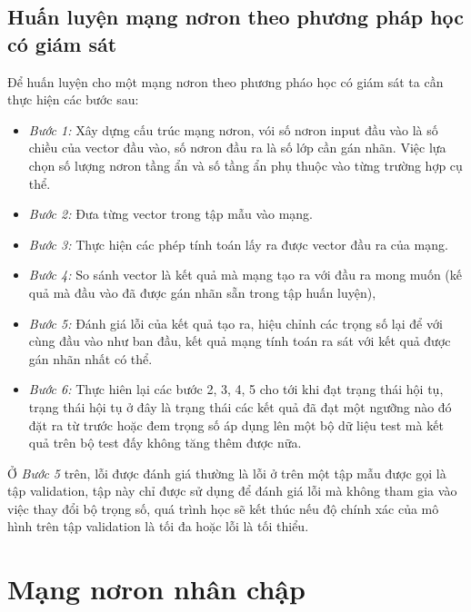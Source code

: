 \documentclass[13pt, a4paper]{extreport}
\begin{document}
\subsection{Huấn luyện mạng nơron theo phương pháp học có giám sát}
\indent Để huấn luyện cho một mạng nơron theo phương pháo học có giám sát ta cần thực hiện các bước sau:
\begin{itemize}
\item \textit{Bước 1: }Xây dựng cấu trúc mạng nơron, vói số nơron input đầu vào là số chiều của vector đầu vào, số nơron đầu ra là số lớp cần gán nhãn. Việc lựa chọn số lượng nơron tầng ẩn và số tầng ẩn phụ thuộc vào từng trường hợp cụ thể.
\item \textit{Bước 2: }Đưa từng vector trong tập mẫu vào mạng.
\item \textit{Bước 3: }Thực hiện các phép tính toán lấy ra được vector đầu ra của mạng.
\item \textit{Bước 4: }So sánh vector là kết quả mà mạng tạo ra với đầu ra mong muốn (kế quả mà đầu vào đã được gán nhãn sẵn trong tập huấn luyện), 
\item \textit{Bước 5: }Đánh giá lỗi của kết quả tạo ra, hiệu chỉnh các trọng số lại để với cùng đầu vào như ban đầu, kết quả mạng tính toán ra sát với kết quả được gán nhãn nhất có thể.
\item \textit{Bước 6: }Thực hiên lại các bước 2, 3, 4, 5 cho tới khi đạt trạng thái hội tụ, trạng thái hội tụ ở đây là trạng thái các kết quả đã đạt một ngưỡng nào đó đặt ra từ trước hoặc đem trọng số áp dụng lên một bộ dữ liệu test mà kết quả trên bộ test đấy không tăng thêm được nữa.
\end{itemize}
\indent Ở \textit{Bước 5} trên, lỗi được đánh giá thường là lỗi ở trên một tập mẫu được gọi là tập validation, tập này chỉ được sử dụng để đánh giá lỗi mà không tham gia vào việc thay đổi bộ trọng số, quá trình học sẽ kết thúc nếu độ chính xác của mô hình trên tập validation là tối đa hoặc lỗi là tối thiểu.
\section{Mạng nơron nhân chập}
\end{document}
